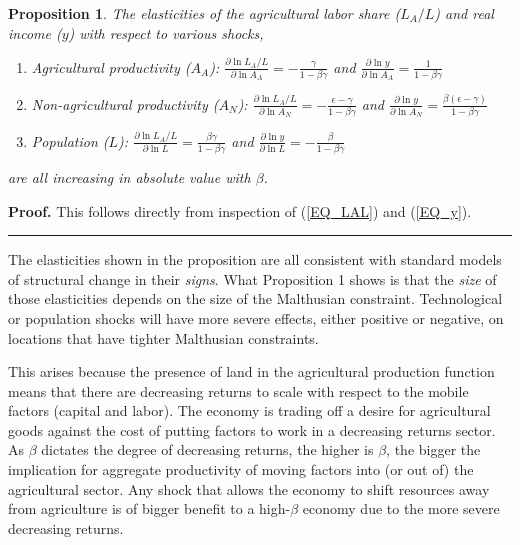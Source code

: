 \documentclass[11pt]{article}
\newtheorem{proposition}{Proposition}
\newenvironment{proof}[1][Proof]{\noindent\textbf{#1.} }{\ \rule{0.5em}{0.5em}}
\begin{document}
\begin{proposition}
The elasticities of the agricultural labor share ($L_A/L$) and real income ($y$) with respect to various shocks,
\begin{enumerate}
	\item[(a)] Agricultural productivity ($A_A$): $\frac{\partial \ln L_A/L}{\partial \ln A_A} = - \frac{\gamma}{1-\beta\gamma}$ and $\frac{\partial \ln y}{\partial \ln A_A} = \frac{1}{1-\beta\gamma}$
	\item[(b)] Non-agricultural productivity ($A_N$): $\frac{\partial \ln L_A/L}{\partial \ln A_N} = - \frac{\epsilon-\gamma}{1-\beta\gamma}$ and $\frac{\partial \ln y}{\partial \ln A_N} = \frac{\beta(\epsilon-\gamma)}{1-\beta\gamma}$
	\item[(c)] Population ($L$): $\frac{\partial \ln L_A/L}{\partial \ln L} = \frac{\beta\gamma}{1-\beta\gamma}$ and $\frac{\partial \ln y}{\partial \ln L} = - \frac{\beta}{1-\beta\gamma}$
\end{enumerate}
are all increasing in absolute value with $\beta$.
\end{proposition}
\begin{proof}
This follows directly from inspection of (\ref{EQ_LAL}) and (\ref{EQ_y}).
\end{proof}

\vspace{.3cm} The elasticities shown in the proposition are all consistent with standard models of structural change \citep{kp2001,Gollin:2007oq,Restuccia:2008hc,Gollin:2010ys,vollrath2011,Alvarez-Cuadrado:2011nx,hrv2014,duarte2010role} in their \textit{signs}. What Proposition 1 shows is that the \textit{size} of those elasticities depends on the size of the Malthusian constraint. Technological or population shocks will have more severe effects, either positive or negative, on locations that have tighter Malthusian constraints. 

This arises because the presence of land in the agricultural production function means that there are decreasing returns to scale with respect to the mobile factors (capital and labor). The economy is trading off a desire for agricultural goods against the cost of putting factors to work in a decreasing returns sector. As $\beta$ dictates the degree of decreasing returns, the higher is $\beta$, the bigger the implication for aggregate productivity of moving factors into (or out of) the agricultural sector. Any shock that allows the economy to shift resources away from agriculture is of bigger benefit to a high-$\beta$ economy due to the more severe decreasing returns. 
\end{document}
